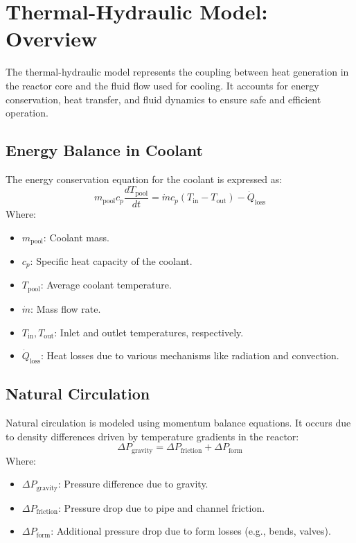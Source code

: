 \section{Thermal-Hydraulic Model: Overview}

The thermal-hydraulic model represents the coupling between heat generation in the reactor core and the fluid flow used for cooling. It accounts for energy conservation, heat transfer, and fluid dynamics to ensure safe and efficient operation.

\subsection{Energy Balance in Coolant}
The energy conservation equation for the coolant is expressed as:
\[
m_{\text{pool}} c_p \frac{dT_{\text{pool}}}{dt} = \dot{m} c_p (T_{\text{in}} - T_{\text{out}}) - \dot{Q}_{\text{loss}}
\]
Where:
\begin{itemize}
    \item \( m_{\text{pool}} \): Coolant mass.
    \item \( c_p \): Specific heat capacity of the coolant.
    \item \( T_{\text{pool}} \): Average coolant temperature.
    \item \( \dot{m} \): Mass flow rate.
    \item \( T_{\text{in}}, T_{\text{out}} \): Inlet and outlet temperatures, respectively.
    \item \( \dot{Q}_{\text{loss}} \): Heat losses due to various mechanisms like radiation and convection.
\end{itemize}

\subsection{Natural Circulation}
Natural circulation is modeled using momentum balance equations. It occurs due to density differences driven by temperature gradients in the reactor:
\[
\Delta P_{\text{gravity}} = \Delta P_{\text{friction}} + \Delta P_{\text{form}}
\]
Where:
\begin{itemize}
    \item \( \Delta P_{\text{gravity}} \): Pressure difference due to gravity.
    \item \( \Delta P_{\text{friction}} \): Pressure drop due to pipe and channel friction.
    \item \( \Delta P_{\text{form}} \): Additional pressure drop due to form losses (e.g., bends, valves).
\end{itemize}

